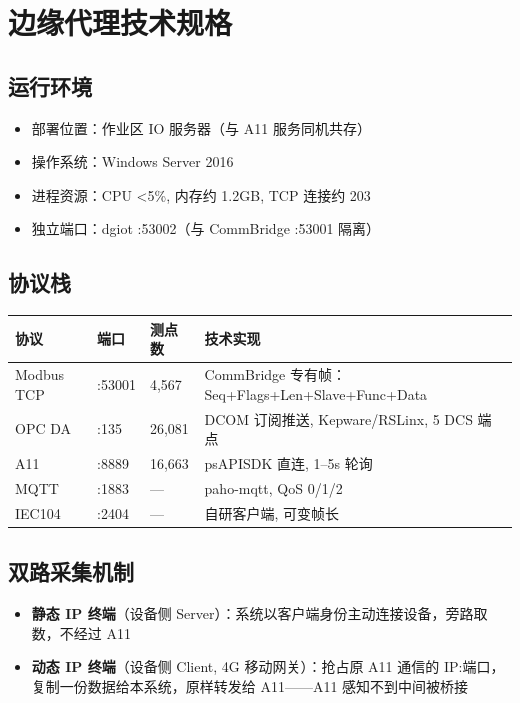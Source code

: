 \documentclass[11pt,a4paper]{ctexart}
\begin{document}
\section{边缘代理技术规格}

\subsection{运行环境}
\begin{itemize}[leftmargin=*]
  \item 部署位置：作业区 IO 服务器（与 A11 服务同机共存）
  \item 操作系统：Windows Server 2016
  \item 进程资源：CPU <5\%, 内存约 1.2GB, TCP 连接约 203
  \item 独立端口：dgiot :53002（与 CommBridge :53001 隔离）
\end{itemize}

\subsection{协议栈}
\begin{table}[H]\centering
\begin{tabular}{p{2.8cm} p{2.4cm} p{2.0cm} p{5.5cm}}
\toprule
\textbf{协议} & \textbf{端口} & \textbf{测点数} & \textbf{技术实现} \\
\midrule
Modbus TCP & :53001 & 4,567 & CommBridge 专有帧：Seq+Flags+Len+Slave+Func+Data \\
OPC DA & :135 & 26,081 & DCOM 订阅推送, Kepware/RSLinx, 5 DCS 端点 \\
A11 & :8889 & 16,663 & psAPISDK 直连, 1--5s 轮询 \\
MQTT & :1883 & — & paho-mqtt, QoS 0/1/2 \\
IEC104 & :2404 & — & 自研客户端, 可变帧长 \\
\bottomrule
\end{tabular}
\end{table}

\subsection{双路采集机制}

\begin{itemize}[leftmargin=*]
  \item \textbf{静态 IP 终端}（设备侧 Server）：系统以客户端身份主动连接设备，旁路取数，不经过 A11
  \item \textbf{动态 IP 终端}（设备侧 Client, 4G 移动网关）：抢占原 A11 通信的 IP:端口，复制一份数据给本系统，原样转发给 A11——A11 感知不到中间被桥接
\end{itemize}
\end{document}
